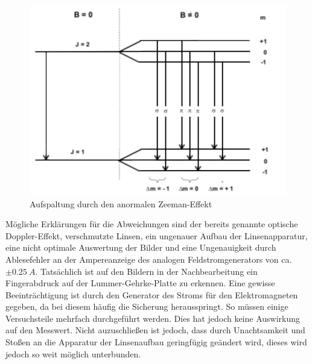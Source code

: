 \begin{figure}[h!]
  \centering
  \includegraphics[width=\textwidth]{anormal.png}
  \caption{Aufspaltung durch den anormalen Zeeman-Effekt \cite{1}}
  \label{fig:normal}
\end{figure}
\FloatBarrier
Mögliche Erklärungen für die Abweichungen sind der bereits genannte optische Doppler-Effekt, verschmutzte Linsen, ein ungenauer Aufbau der Linsenapparatur, eine nicht optimale Auswertung der Bilder und eine Ungenauigkeit durch Ablesefehler an der Ampereanzeige des analogen Feldstromgenerators von ca. $\pm \SI{0.25}{A}$.
Tatsächlich ist auf den Bildern in der Nachbearbeitung ein Fingerabdruck auf der Lummer-Gehrke-Platte zu erkennen.
Eine gewisse Beeinträchtigung ist durch den Generator des Stroms für den Elektromagneten gegeben, da bei diesem häufig die Sicherung herausspringt.
So müssen einige Versuchsteile mehrfach durchgeführt werden.
Dies hat jedoch keine Auswirkung auf den Messwert.
Nicht auzuschließen ist jedoch, dass durch Unachtsamkeit und Stoßen an die Apparatur der Linsenaufbau geringfügig geändert wird, dieses wird jedoch so weit möglich unterbunden.
